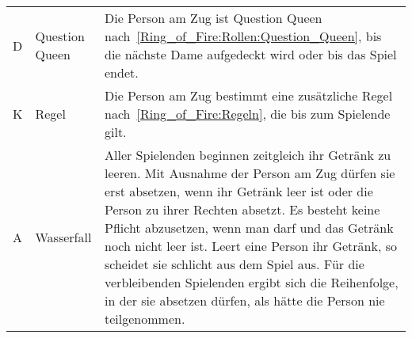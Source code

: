 \begin{enumerate}[label={(\arabic*)}]
\begin{longtable}[r]{p{}  p{}  p{}}
		D  & Question Queen & Die Person am Zug ist Question Queen nach~\ref{Ring_of_Fire:Rollen:Question_Queen}, bis die nächste Dame aufgedeckt wird oder bis das Spiel endet.\\
		K  & Regel          & Die Person am Zug bestimmt eine zusätzliche Regel nach~\ref{Ring_of_Fire:Regeln}, die bis zum Spielende gilt.\\
		A  & Wasserfall     & Aller Spielenden beginnen zeitgleich ihr Getränk zu leeren.
		Mit Ausnahme der Person am Zug dürfen sie erst absetzen, wenn ihr Getränk leer ist oder die Person zu ihrer Rechten absetzt.
		Es besteht keine Pflicht abzusetzen, wenn man darf und das Getränk noch nicht leer ist.
		Leert eine Person ihr Getränk, so scheidet sie schlicht aus dem Spiel aus.
		Für die verbleibenden Spielenden ergibt sich die Reihenfolge, in der sie absetzen dürfen, als hätte die Person nie teilgenommen.\\
		\bottomrule
	\end{longtable}
\end{enumerate}


